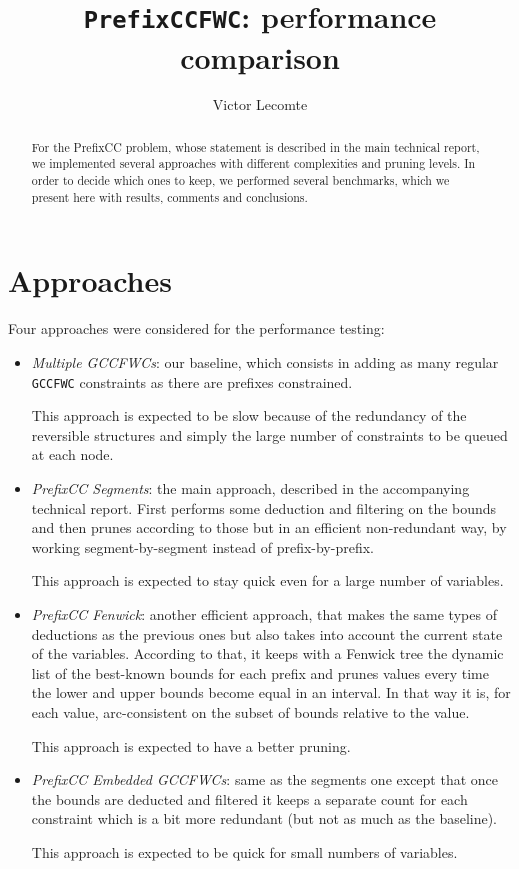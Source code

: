\documentclass[a4paper,10pt]{article}
\begin{document}
\title{\texttt{PrefixCCFWC}: performance comparison}
\author{Victor Lecomte}
\maketitle

\begin{abstract}
For the PrefixCC problem, whose statement is described in the main technical report, we implemented several approaches with different complexities and pruning levels. In order to decide which ones to keep, we performed several benchmarks, which we present here with results, comments and conclusions.
\end{abstract}

\tableofcontents

\section{Approaches}

Four approaches were considered for the performance testing:
\begin{itemize}
    \item \emph{Multiple GCCFWCs}: our baseline, which consists in adding as many regular \texttt{GCCFWC} constraints as there are prefixes constrained.
    
    This approach is expected to be slow because of the redundancy of the reversible structures and simply the large number of constraints to be queued at each node.
    \item \emph{PrefixCC Segments}: the main approach, described in the accompanying technical report. First performs some deduction and filtering on the bounds and then prunes according to those but in an efficient non-redundant way, by working segment-by-segment instead of prefix-by-prefix.
    
    This approach is expected to stay quick even for a large number of variables.
    \item \emph{PrefixCC Fenwick}: another efficient approach, that makes the same types of deductions as the previous ones but also takes into account the current state of the variables. According to that, it keeps with a Fenwick tree the dynamic list of the best-known bounds for each prefix and prunes values every time the lower and upper bounds become equal in an interval. In that way it is, for each value, arc-consistent on the subset of bounds relative to the value.
    
    This approach is expected to have a better pruning.
    \item \emph{PrefixCC Embedded GCCFWCs}: same as the segments one except that once the bounds are deducted and filtered it keeps a separate count for each constraint which is a bit more redundant (but not as much as the baseline).
    
    This approach is expected to be quick for small numbers of variables.
\end{itemize}
\end{document}
